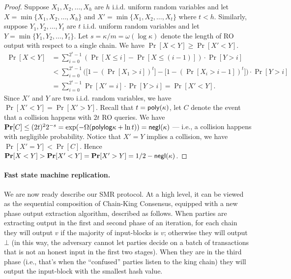 \begin{proof}
    Suppose $X_1, X_2, \ldots, X_h$ are $h$ i.i.d. uniform random variables and let $X = \min \{ X_1, X_2, \ldots,\allowbreak X_h \}$ and $X' = \min \{ X_1, X_2, \ldots, X_t \}$ where $t < h$.
    Similarly, suppose $Y_1, Y_2, \ldots, Y_t$ are $t$ i.i.d. uniform random variables and let $Y = \min \{ Y_1, Y_2, \ldots, Y_t \}$.
    Let $s = \kappa / m = \omega(\log \kappa)$ denote the length of RO output with respect to a single chain.
    We have $\Pr[X < Y] \ge \Pr[X' < Y]$.
    \begin{align*}
        \Pr[X < Y] & = \sum_{i = 0}^{2^{s} - 1} (\Pr[X \le i] - \Pr[X \le (i - 1)]) \cdot \Pr[Y > i]
        \\
                   & < \sum_{i = 0}^{2^s - 1} \Big( \big[1 - (\Pr[X_1 > i])^t \big] - \big[1 - (\Pr[X_i > i - 1])^t \big] \Big) \cdot \Pr[Y > i]
        \\
                   & = \sum_{i = 0}^{2^s - 1} \Pr[X' = i] \cdot \Pr[Y > i] = \Pr[X' < Y].
    \end{align*}
    Since $X'$ and $Y$ are two i.i.d. random variables, we have $\Pr[X' < Y] = \Pr[X' > Y]$.
    Recall that $t = \mathsf{poly}(\kappa)$, let $C$ denote the event that a collision happens with $2t$ RO queries.
    We have $\mathbf{Pr}[C] \le (2t)^2 2^{-s} = \exp(-\Omega(\mathsf{polylog} \kappa + \ln t)) = \mathsf{negl}(\kappa)$ --- i.e., a collision happens with negligible probability.
    Notice that $X' = Y$ implies a collision, we have $\Pr[X' = Y] < \Pr[C]$.
    Hence $\mathbf{Pr}[X < Y] > \mathbf{Pr}[X' < Y] = \mathbf{Pr}[X' > Y] = 1 / 2 -\mathsf{negl}(\kappa)$.
\end{proof}

\paragraph{Fast state machine replication.}
%
We are now ready describe our SMR protocol.
%
At a high level, it can be viewed as the sequential composition of Chain-King Consensus, equipped with a new phase output extraction algorithm, described as follows.
%
When parties are extracting output in the first and second phase of an iteration, for each chain they will output $v$ if the majority of input-blocks is $v$; otherwise they will output $\bot$ (in this way, the adversary cannot let parties decide on a batch of transactions that is not an honest input in the first two stages).
%
When they are in the third phase (i.e., that's when the ``confused'' parties listen to the king chain) they will output the input-block with the smallest hash value.

